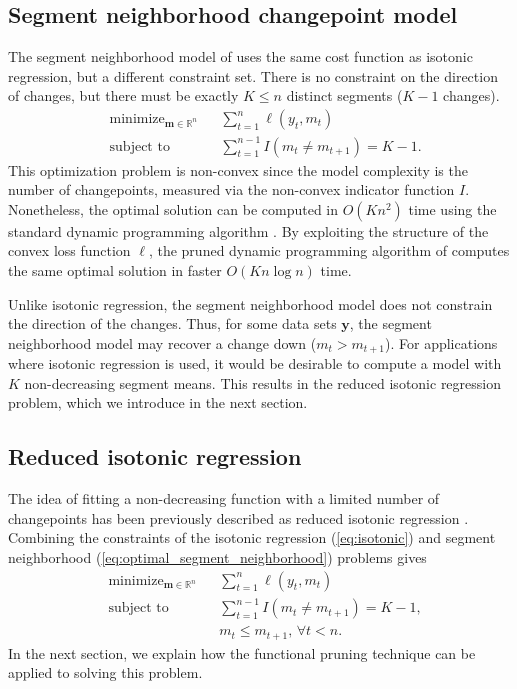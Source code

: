 \documentclass{article}
\DeclareMathOperator*{\minimize}{minimize}
\newcommand{\RR}{\mathbb R}
\begin{document}
\subsection{Segment neighborhood changepoint model}


The segment neighborhood model of \citet{segment-neighborhood} uses
the same cost function as isotonic regression, but a different
constraint set. There is no constraint on the direction of changes,
but there must be exactly $K\leq n$ distinct segments ($K-1$ changes).
\begin{align}
  \label{eq:optimal_segment_neighborhood}
  &\minimize_{\mathbf m\in\RR^n} && 
  \sum_{t=1}^n \ell(y_t, m_t)\\
  &\text{subject to} && \sum_{t=1}^{n-1} I(m_t \neq m_{t+1}) = K-1.
  \nonumber
\end{align}
This optimization problem is non-convex since the model complexity is
the number of changepoints, measured via the non-convex indicator
function $I$. Nonetheless, the optimal solution can be computed in
$O(K n^2)$ time using the standard dynamic programming algorithm
\citep{segment-neighborhood}. By exploiting the structure of the
convex loss function $\ell$, the pruned dynamic programming algorithm
of \citet{pruned-dp} computes the same optimal solution in faster
$O(K n \log n)$ time.

Unlike isotonic regression, the segment neighborhood model does not
constrain the direction of the changes. Thus, for some data sets
$\mathbf y$, the segment neighborhood model may recover a change down
($m_t > m_{t+1}$). For applications where isotonic regression is used,
it would be desirable to compute a model with $K$ non-decreasing
segment means. This results in the reduced isotonic regression
problem, which we introduce in the next section.

\subsection{Reduced isotonic regression}

The idea of fitting a non-decreasing function with a limited number of
changepoints has been previously described as reduced isotonic
regression \citep{reduced-monotonic-regression}. Combining the
constraints of the isotonic regression (\ref{eq:isotonic}) and segment
neighborhood (\ref{eq:optimal_segment_neighborhood}) problems gives
\begin{align}
  \label{eq:reduced}
  &\minimize_{\mathbf m\in\RR^n} && 
  \sum_{t=1}^n \ell(y_t, m_t)\\
  &\text{subject to} && \sum_{t=1}^{n-1} I(m_t \neq m_{t+1}) = K-1,
  \nonumber\\
  & && m_t \leq m_{t+1},\, \forall t<n.
  \nonumber 
\end{align}
In the next section, we explain how the functional pruning technique
can be applied to solving this problem.
\end{document}
